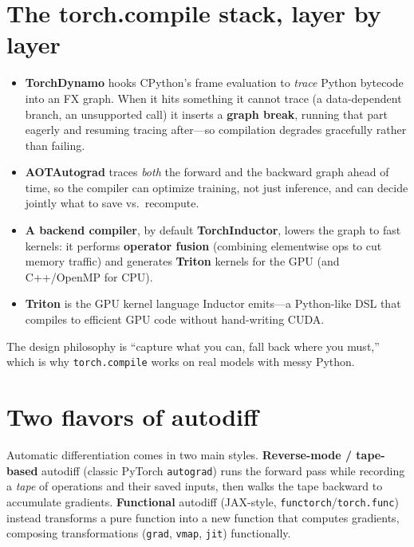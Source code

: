 \documentclass[11pt]{article}
\begin{document}
\section{The torch.compile stack, layer by layer}
\begin{itemize}[leftmargin=1.4em]
\item \textbf{TorchDynamo} hooks CPython's frame evaluation to \emph{trace} Python bytecode into an FX graph.
When it hits something it cannot trace (a data-dependent branch, an unsupported call) it inserts a
\textbf{graph break}, running that part eagerly and resuming tracing after---so compilation degrades
gracefully rather than failing.
\item \textbf{AOTAutograd} traces \emph{both} the forward and the backward graph ahead of time, so the
compiler can optimize training, not just inference, and can decide jointly what to save vs.\ recompute.
\item \textbf{A backend compiler}, by default \textbf{TorchInductor}, lowers the graph to fast kernels:
it performs \textbf{operator fusion} (combining elementwise ops to cut memory traffic) and generates
\textbf{Triton} kernels for the GPU (and C++/OpenMP for CPU).
\item \textbf{Triton} is the GPU kernel language Inductor emits---a Python-like DSL that compiles to
efficient GPU code without hand-writing CUDA.
\end{itemize}
The design philosophy is ``capture what you can, fall back where you must,'' which is why
\texttt{torch.compile} works on real models with messy Python.

\section{Two flavors of autodiff}
Automatic differentiation comes in two main styles. \textbf{Reverse-mode / tape-based} autodiff (classic
PyTorch \texttt{autograd}) runs the forward pass while recording a \emph{tape} of operations and their saved
inputs, then walks the tape backward to accumulate gradients. \textbf{Functional} autodiff (JAX-style,
\texttt{functorch}/\texttt{torch.func}) instead transforms a pure function into a new function that computes
gradients, composing transformations (\texttt{grad}, \texttt{vmap}, \texttt{jit}) functionally.
\end{document}
